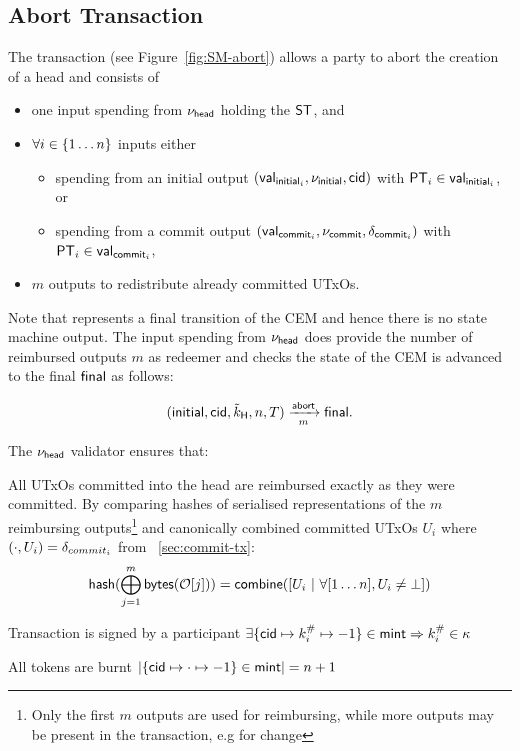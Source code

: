 \subsection{Abort Transaction}\label{sec:abort-tx}

\begin{samepage}
The \mtxAbort{} transaction (see Figure~\ref{fig:SM-abort}) allows a
party to abort the creation of a head and consists of
\begin{itemize}
  \item one input spending from $\nu_\mathsf{head}$ holding the $\mathsf{ST}$, and
  \item $\forall i \in \{1 \dots n\}$ inputs either
    \begin{itemize}
      \item spending from an initial output $(\mathsf{val}_{\mathsf{initial}_{i}}, \nu_{\mathsf{initial}}, \mathsf{cid})$ with $\mathsf{PT}_{i} \in \mathsf{val}_{\mathsf{initial}_{i}}$, or
      \item spending from a commit output $(\mathsf{val}_{\mathsf{commit}_{i}}, \nu_{\mathsf{commit}}, \delta_{\mathsf{commit}_{i}})$ with $\mathsf{PT}_{i} \in \mathsf{val}_{\mathsf{commit}_{i}}$,
    \end{itemize}
  \item $m$ outputs to redistribute already committed UTxOs.
\end{itemize}
\end{samepage}

\noindent Note that \mtxAbort{} represents a final transition of the CEM and hence there
is no state machine output. The input spending from $\nu_\mathsf{head}$ does provide the
number of reimbursed outputs $m$ as redeemer  and checks the state of the CEM is
advanced to the final $\mathsf{final}$ as follows:

\[
   (\mathsf{initial},\mathsf{cid},\tilde{k}_{\mathsf{H}},n,T) \xrightarrow[m]{\mathsf{abort}} \mathsf{final}.
\]

\begin{samepage}
\noindent The $\nu_\mathsf{head}$ validator ensures that:
\begin{menumerate}
  \item All UTxOs committed into the head are reimbursed exactly as they were
  committed. By comparing hashes of serialised representations of the $m$
  reimbursing outputs\footnote{Only the first $m$ outputs are used for
    reimbursing, while more outputs may be present in the transaction, e.g for
    change} and canonically combined committed UTxOs $U_{i}$ where $(\cdot, U_{i}) = \delta_{commit_{i}}$ from \mtxCom{}~\ref{sec:commit-tx}:
  \[
    \mathsf{hash}(\bigoplus_{j=1}^{m} \mathsf{bytes}(\mathcal{O}[j])) = \mathsf{combine}([U_{i} ~ | ~ \forall [1\dots n], U_{i} \neq \bot])
  \]

  \item Transaction is signed by a participant $\exists \{\mathsf{cid} \mapsto k^{\#}_{i} \mapsto -1\} \in \mathsf{mint} \Rightarrow k^{\#}_{i} \in \kappa$
  \item All tokens are burnt
  $|\{\mathsf{cid} \mapsto \cdot \mapsto -1\} \in \mathsf{mint}| = n + 1$
\end{menumerate}
\end{samepage}

